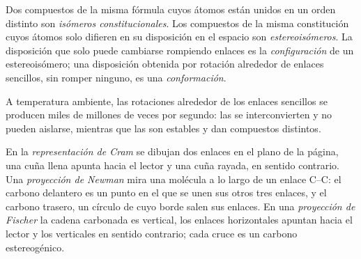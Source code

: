 \begin{definition}\label{def:b1:stereochemistry-in-depth:isomers}
Dos compuestos de la misma fórmula cuyos átomos están unidos en un orden
distinto son \emph{isómeros constitucionales}.
Los compuestos de la misma constitución cuyos átomos solo difieren en su
disposición en el espacio son \emph{estereoisómeros}. La
disposición que solo puede cambiarse rompiendo enlaces es la
\emph{configuración} de un estereoisómero; una disposición
obtenida por rotación alrededor de enlaces sencillos, sin romper ninguno,
es una \emph{conformación}.
\end{definition}

A temperatura ambiente, las rotaciones alrededor de los enlaces sencillos
se producen miles de millones de veces por segundo: las  se
interconvierten y no pueden aislarse, mientras que las 
son estables y dan compuestos distintos.

\begin{definition}[Representaciones]\label{def:b1:stereochemistry-in-depth:representations}
En la \emph{representación de Cram} se dibujan dos
enlaces en el plano de la página, una cuña llena apunta hacia el lector y
una cuña rayada, en sentido contrario. Una \emph{proyección de
Newman} mira una molécula a lo largo de un enlace
C--C: el carbono delantero es un punto en el que se unen sus otros tres
enlaces, y el carbono trasero, un círculo de cuyo borde salen sus
enlaces. En una \emph{proyección de Fischer}
la cadena carbonada es vertical, los enlaces horizontales apuntan hacia el
lector y los verticales en sentido contrario; cada cruce es un carbono
estereogénico.
\end{definition}


